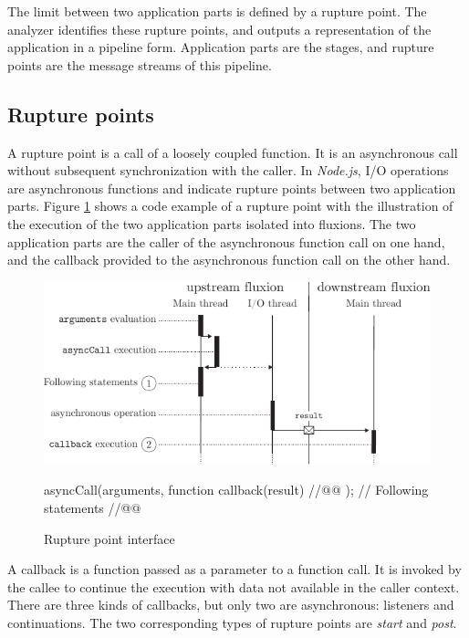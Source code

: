 The limit between two application parts is defined by a rupture point.
The analyzer identifies these rupture points, and outputs a representation of the application in a pipeline form.
Application parts are the stages, and rupture points are the message streams of this pipeline.

\subsection{Rupture points} \label{chapter5:flx-compiler:analyzer:rupture}

A rupture point is a call of a loosely coupled function.
It is an asynchronous call without subsequent synchronization with the caller.
In \textit{Node.js}, I/O operations are asynchronous functions and indicate rupture points between two application parts.
Figure \ref{fig:basicrp} shows a code example of a rupture point with the illustration of the execution of the two application parts isolated into fluxions.
The two application parts are the caller of the asynchronous function call on one hand, and the callback provided to the asynchronous function call on the other hand.

\begin{figure}[h!]
  \includegraphics[width=\linewidth]{../resources/basicrp.pdf}
  \begin{code}
asyncCall(arguments, function callback(result){ //@@ });
// Following statements //@@
  \end{code}
  \caption{Rupture point interface}
  \label{fig:basicrp}
\end{figure}

A callback is a function passed as a parameter to a function call.
It is invoked by the callee to continue the execution with data not available in the caller context.
There are three kinds of callbacks, but only two are asynchronous: listeners and continuations.
The two corresponding types of rupture points are \textit{start} and \textit{post}.


